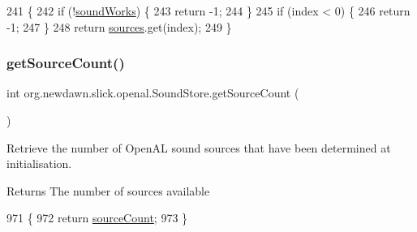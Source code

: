 \begin{DoxyCode}
241                                     \{
242         \textcolor{keywordflow}{if} (!\mbox{\hyperlink{classorg_1_1newdawn_1_1slick_1_1openal_1_1_sound_store_ae563e9c1a01e333dc2350f1450f451fd}{soundWorks}}) \{
243             \textcolor{keywordflow}{return} -1;
244         \}
245         \textcolor{keywordflow}{if} (index < 0) \{
246             \textcolor{keywordflow}{return} -1;
247         \}
248         \textcolor{keywordflow}{return} \mbox{\hyperlink{classorg_1_1newdawn_1_1slick_1_1openal_1_1_sound_store_a3a2ffa73acd847102bb30140129c440b}{sources}}.get(index);
249     \}
\end{DoxyCode}
\mbox{\label{classorg_1_1newdawn_1_1slick_1_1openal_1_1_sound_store_a7ac0185b28b942ded76f97ac2c93a833}} 
\subsubsection{\texorpdfstring{get\+Source\+Count()}{getSourceCount()}}
{\footnotesize\ttfamily int org.\+newdawn.\+slick.\+openal.\+Sound\+Store.\+get\+Source\+Count (\begin{DoxyParamCaption}{ }\end{DoxyParamCaption})\hspace{0.3cm}{\ttfamily [inline]}}

Retrieve the number of Open\+AL sound sources that have been determined at initialisation.

\begin{DoxyReturn}{Returns}
The number of sources available 
\end{DoxyReturn}

\begin{DoxyCode}
971                                 \{
972         \textcolor{keywordflow}{return} \mbox{\hyperlink{classorg_1_1newdawn_1_1slick_1_1openal_1_1_sound_store_ad1c2294ac984e23e608068a85aba4b69}{sourceCount}};
973     \}
\end{DoxyCode}
\mbox{\label{classorg_1_1newdawn_1_1slick_1_1openal_1_1_sound_store_a7ebe093db6c98d29e5673158d0ac4191}} 
